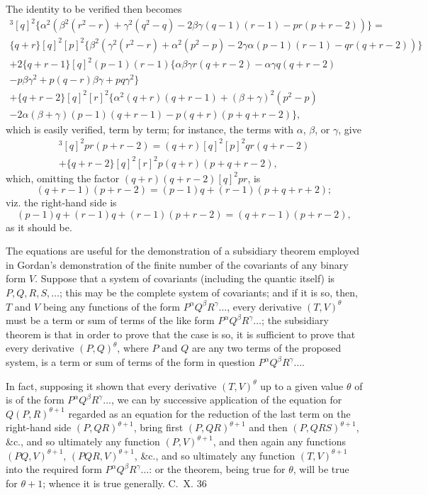 \documentclass[11pt,a4paper]{book}
\begin{document}
The identity to be verified then becomes
\begin{multline*}
[q + r]^3 [q]^2 \{\alpha^2(\beta^2(r^2 - r) + \gamma^2(q^2 - q) - 2\beta\gamma(q - 1)(r - 1) - pr(p + r - 2))\} = \\
\{q + r\} [q]^2 [p]^2 \{\beta^2(\gamma^2(r^2 - r) + \alpha^2(p^2 - p) - 2\gamma\alpha(p - 1)(r - 1) - qr(q + r - 2))\} \\
+ 2\{q + r - 1\} [q]^2 (p - 1)(r - 1) \{\alpha\beta\gamma r(q + r - 2) - \alpha\gamma q(q + r - 2) \\
- p\beta\gamma^2 + p(q - r)\beta\gamma + pq\gamma^2\} \\
+ \{q + r - 2\} [q]^2 [r]^2 \{\alpha^2(q + r)(q + r - 1) + (\beta + \gamma)^2(p^2 - p) \\
- 2\alpha(\beta + \gamma)(p - 1)(q + r - 1) - p(q + r)(p + q + r - 2)\},
\end{multline*}
which is easily verified, term by term; for instance, the terms with $\alpha$, $\beta$, or $\gamma$, give
\begin{multline*}
[q + r]^3 [q]^2 pr(p + r - 2) = (q + r) [q]^2 [p]^2 qr(q + r - 2) \\
+ \{q + r - 2\} [q]^2 [r]^2 p(q + r)(p + q + r - 2),
\end{multline*}
which, omitting the factor $(q + r)(q + r - 2)[q]^2 pr$, is
\[
(q + r - 1)(p + r - 2) = (p - 1)q + (r - 1)(p + q + r + 2);
\]
viz. the right-hand side is
\[
(p - 1)q + (r - 1)q + (r - 1)(p + r - 2) = (q + r - 1)(p + r - 2),
\]
as it should be.

The equations are useful for the demonstration of a subsidiary theorem employed in Gordan's demonstration of the finite number of the covariants of any binary form $V$. Suppose that a system of covariants (including the quantic itself) is $P, Q, R, S, \ldots$; this may be the complete system of covariants; and if it is so, then, $T$ and $V$ being any functions of the form $P^\alpha Q^\beta R^\gamma \ldots$, every derivative $(T, V)^\theta$ must be a term or sum of terms of the like form $P^\alpha Q^\beta R^\gamma \ldots$; the subsidiary theorem is that in order to prove that the case is so, it is sufficient to prove that every derivative $(P, Q)^\theta$, where $P$ and $Q$ are any two terms of the proposed system, is a term or sum of terms of the form in question $P^\alpha Q^\beta R^\gamma \ldots$.

In fact, supposing it shown that every derivative $(T, V)^\theta$ up to a given value $\theta$ of is of the form $P^\alpha Q^\beta R^\gamma \ldots$, we can by successive application of the equation for $Q(P, R)^{\theta + 1}$ regarded as an equation for the reduction of the last term on the right-hand side $(P, QR)^{\theta + 1}$, bring first $(P, QR)^{\theta + 1}$ and then $(P, QRS)^{\theta + 1}$, \&c., and so ultimately any function $(P, V)^{\theta + 1}$, and then again any functions $(PQ, V)^{\theta + 1}$, $(PQR, V)^{\theta + 1}$, \&c., and so ultimately any function $(T, V)^{\theta + 1}$ into the required form $P^\alpha Q^\beta R^\gamma \ldots$: or the theorem, being true for $\theta$, will be true for $\theta + 1$; whence it is true generally.
\hfill C.~X. 36
\end{document}
